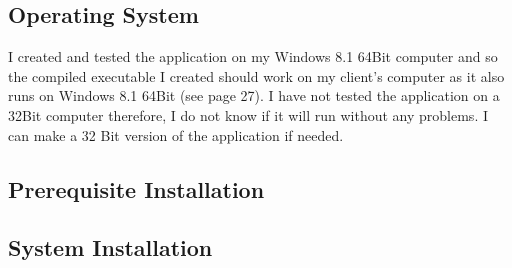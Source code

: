 \subsection{Operating System}
I created and tested the application on my Windows 8.1 64Bit computer and so the compiled executable I created should work on my client's computer as it also runs on Windows 8.1 64Bit (see page 27). I have not tested the application on a 32Bit computer therefore, I do not know if it will run without any problems. I can make a 32 Bit version of the application if needed.

\subsection{Prerequisite Installation}

\subsection{System Installation}
